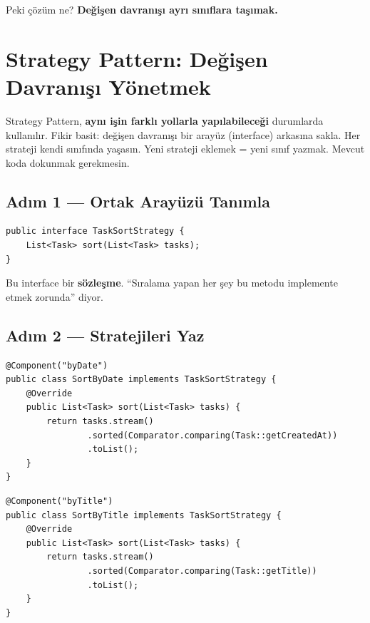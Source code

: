 \documentclass[11pt,a4paper]{article}
\begin{document}
Peki \c{c}\"{o}z\"{u}m ne? \textbf{De\u{g}i\c{s}en davran{\i}\c{s}{\i} ayr{\i} s{\i}n{\i}flara ta\c{s}{\i}mak.}

\newpage

\section{Strategy Pattern: De\u{g}i\c{s}en Davran{\i}\c{s}{\i} Y\"{o}netmek}

Strategy Pattern, \textbf{ayn{\i} i\c{s}in farkl{\i} yollarla yap{\i}labilece\u{g}i} durumlarda kullan{\i}l{\i}r. Fikir basit: de\u{g}i\c{s}en davran{\i}\c{s}{\i} bir aray\"{u}z (interface) arkas{\i}na sakla. Her strateji kendi s{\i}n{\i}f{\i}nda ya\c{s}as{\i}n. Yeni strateji eklemek = yeni s{\i}n{\i}f yazmak. Mevcut koda dokunmak gerekmesin.

\subsection*{Ad{\i}m 1 --- Ortak Aray\"{u}z\"{u} Tan{\i}mla}

\begin{lstlisting}[style=java]
public interface TaskSortStrategy {
    List<Task> sort(List<Task> tasks);
}
\end{lstlisting}

Bu interface bir \textbf{s\"{o}zle\c{s}me}. ``S{\i}ralama yapan her \c{s}ey bu metodu implemente etmek zorunda'' diyor.

\subsection*{Ad{\i}m 2 --- Stratejileri Yaz}

\begin{lstlisting}[style=java]
@Component("byDate")
public class SortByDate implements TaskSortStrategy {
    @Override
    public List<Task> sort(List<Task> tasks) {
        return tasks.stream()
                .sorted(Comparator.comparing(Task::getCreatedAt))
                .toList();
    }
}
\end{lstlisting}

\begin{lstlisting}[style=java]
@Component("byTitle")
public class SortByTitle implements TaskSortStrategy {
    @Override
    public List<Task> sort(List<Task> tasks) {
        return tasks.stream()
                .sorted(Comparator.comparing(Task::getTitle))
                .toList();
    }
}
\end{lstlisting}
\end{document}
